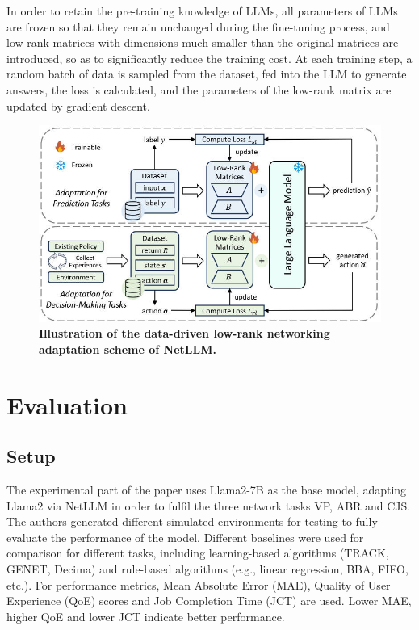 \documentclass[twocolumn]{article}
\begin{document}
In order to retain the pre-training knowledge of LLMs, all parameters of LLMs are frozen so that they remain unchanged during the fine-tuning process, and low-rank matrices with dimensions much smaller than the original matrices are introduced, so as to significantly reduce the training cost. At each training step, a random batch of data is sampled from the dataset, fed into the LLM to generate answers, the loss is calculated, and the parameters of the low-rank matrix are updated by gradient descent.

\begin{figure}[t]
  \centering
  \includegraphics[width=1\linewidth]{img/figure10.jpg}
  \caption{\textbf{Illustration of the data-driven low-rank networking adaptation scheme of NetLLM.}}
  \label{fig:10}
\end{figure}

\section{Evaluation}

\subsection{Setup}
The experimental part of the paper uses Llama2-7B as the base model, adapting Llama2 via NetLLM in order to fulfil the three network tasks VP, ABR and CJS. The authors generated different simulated environments for testing to fully evaluate the performance of the model. Different baselines were used for comparison for different tasks, including learning-based algorithms (TRACK, GENET, Decima) and rule-based algorithms (e.g., linear regression, BBA, FIFO, etc.). For performance metrics, Mean Absolute Error (MAE), Quality of User Experience (QoE) scores and Job Completion Time (JCT) are used. Lower MAE, higher QoE and lower JCT indicate better performance.
\end{document}
